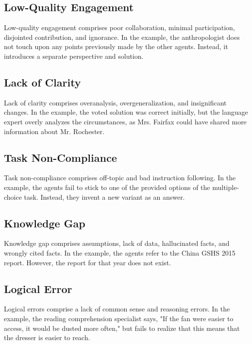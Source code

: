 \subsection{Low-Quality Engagement}
Low-quality engagement comprises poor collaboration, minimal participation, disjointed contribution, and ignorance. 
In the example, the anthropologist does not touch upon any points previously made by the other agents. Instead, it introduces a separate perspective and solution.


\subsection{Lack of Clarity}
Lack of clarity comprises overanalysis, overgeneralization, and insignificant changes.
In the example, the voted solution was correct initially, but the language expert overly analyzes the circumstances, as Mrs. Fairfax could have shared more information about Mr. Rochester.


\subsection{Task Non-Compliance}
Task non-compliance comprises off-topic and bad instruction following.
In the example, the agents fail to stick to one of the provided options of the multiple-choice task. Instead, they invent a new variant as an answer.


\subsection{Knowledge Gap}
Knowledge gap comprises assumptions, lack of data, hallucinated facts, and wrongly cited facts.
In the example, the agents refer to the China GSHS 2015 report. However, the report for that year does not exist.


\subsection{Logical Error}
Logical errors comprise a lack of common sense and reasoning errors.
In the example, the reading comprehension specialist says, "If the fan were easier to access, it would be dusted more often," but fails to realize that this means that the dresser is easier to reach.


